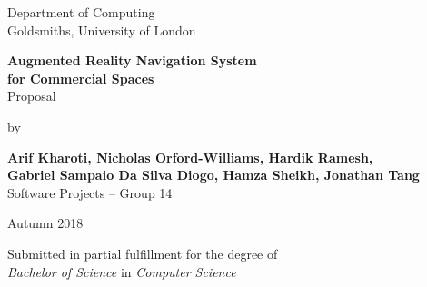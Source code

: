 \documentclass[12pt]{report}
\newcommand\blankpage{%
    \null
    \thispagestyle{empty}%
    \addtocounter{page}{-1}%
    \newpage}
\begin{document}
\begin{titlepage}
    \BgThispage
    \begin{center}
        \vspace*{1cm}
        Department of Computing\\
        Goldsmiths, University of London\\

        \vspace*{3.25cm}

        \textbf{\LARGE Augmented Reality Navigation System\\}
        \vspace*{0.20cm}           
        \textbf{\LARGE for Commercial Spaces}\\
        \vspace*{0.55cm}           
        {\large Proposal}\\
        \vspace*{0.15cm}           

        \vspace*{2cm}
        by\\
        \vspace*{0.25cm}   

        \textbf{Arif Kharoti, Nicholas Orford-Williams, Hardik Ramesh,\\}
        \textbf{Gabriel Sampaio Da Silva Diogo, Hamza Sheikh, Jonathan Tang\\}
        \vspace*{0.1cm}    
        Software Projects – Group 14\\  

        \vspace{2cm}

        Autumn 2018
        \vfill

        Submitted in partial fulfillment for the degree of\\
        \textit{Bachelor of Science} in \textit{Computer Science}

        \vspace{1.5cm}

    \end{center}
\end{titlepage}

\afterpage{\blankpage}

\thispagestyle{plain}

\end{document}
